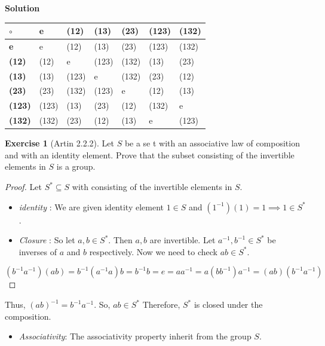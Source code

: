 \documentclass[
]{book}
\providecommand{\tightlist}{%
  \setlength{\itemsep}{0pt}\setlength{\parskip}{0pt}}
\theoremstyle{definition}
\theoremstyle{definition}
\theoremstyle{definition}
\newtheorem{exercise}{Exercise}[chapter]
\theoremstyle{definition}
\theoremstyle{remark}
\begin{document}
\textbf{Solution}

\begin{longtable}[]{@{}lllllll@{}}
\toprule\noalign{}
\(\circ\) & \textbf{e} & (12) & (13) & (23) & (123) & (132) \\
\midrule\noalign{}
\endhead
\bottomrule\noalign{}
\endlastfoot
\textbf{e} & e & (12) & (13) & (23) & (123) & (132) \\
\textbf{(12)} & (12) & e & (123) & (132) & (13) & (23) \\
\textbf{(13)} & (13) & (123) & e & (132) & (23) & (12) \\
\textbf{(23)} & (23) & (132) & (123) & e & (12) & (13) \\
\textbf{(123)} & (123) & (13) & (23) & (12) & (132) & e \\
\textbf{(132)} & (132) & (23) & (12) & (13) & e & (123) \\
\end{longtable}

\begin{exercise}[Artin 2.2.2]
\protect\hypertarget{exr:unnamed-chunk-70}{}\label{exr:unnamed-chunk-70}Let \(S\) be a se t with an associative law of composition and with an identity element. Prove that the subset consisting of the invertible elements in \(S\) is a group.
\end{exercise}

\begin{proof}
Let \(S^*\subseteq S\) with consisting of the invertible elements in \(S\).

\begin{itemize}
\item
  \emph{identity} : We are given identity element \(1 \in S\) and \((1^{-1})(1)=1 \implies 1 \in S^*\).
\item
  \emph{Closure} :
  So let \(a,b\in S^*\). Then \(a,b\) are invertible. Let \(a^{-1},b^{-1}\in S^*\) be inverses of \(a\) and \(b\) respectively. Now we need to check \(ab\in S^*\).\\
\end{itemize}

\[(b^{-1}a^{-1})(ab)=b^{-1}(a^{-1}a)b=b^{-1}b=e=
  aa^{-1}=a(bb^{-1})a^{-1}=(ab)(b^{-1}a^{-1})\]
\end{proof}

Thus, \((ab)^{-1}=b^{-1}a^{-1}\). So, \(ab\in S^*\)
Therefore, \(S^*\) is closed under the composition.

\begin{itemize}
\tightlist
\item
  \emph{Associativity}: The associativity property inherit from the group \(S\).
\end{itemize}
\end{document}
